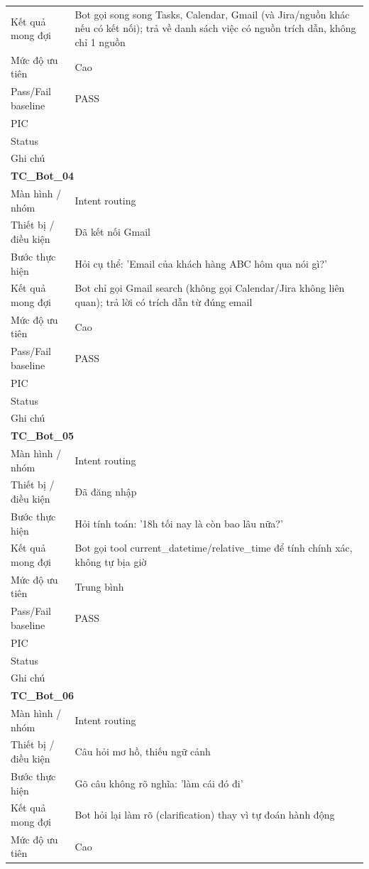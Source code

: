 \documentclass[12pt,a4paper]{article}
\begin{document}
\begin{longtable}{p{3.0cm}p{11.5cm}}
Kết quả mong đợi & Bot gọi song song Tasks, Calendar, Gmail (và Jira/nguồn khác nếu có kết nối); trả về danh sách việc có nguồn trích dẫn, không chỉ 1 nguồn \\
Mức độ ưu tiên & Cao \\
Pass/Fail baseline & PASS \\
PIC &  \\
Status &  \\
Ghi chú &  \\
\midrule
\multicolumn{2}{l}{\textbf{TC\_Bot\_04}} \\
Màn hình / nhóm & Intent routing \\
Thiết bị / điều kiện & Đã kết nối Gmail \\
Bước thực hiện & Hỏi cụ thể: 'Email của khách hàng ABC hôm qua nói gì?' \\
Kết quả mong đợi & Bot chỉ gọi Gmail search (không gọi Calendar/Jira không liên quan); trả lời có trích dẫn từ đúng email \\
Mức độ ưu tiên & Cao \\
Pass/Fail baseline & PASS \\
PIC &  \\
Status &  \\
Ghi chú &  \\
\midrule
\multicolumn{2}{l}{\textbf{TC\_Bot\_05}} \\
Màn hình / nhóm & Intent routing \\
Thiết bị / điều kiện & Đã đăng nhập \\
Bước thực hiện & Hỏi tính toán: '18h tối nay là còn bao lâu nữa?' \\
Kết quả mong đợi & Bot gọi tool current\_datetime/relative\_time để tính chính xác, không tự bịa giờ \\
Mức độ ưu tiên & Trung bình \\
Pass/Fail baseline & PASS \\
PIC &  \\
Status &  \\
Ghi chú &  \\
\midrule
\multicolumn{2}{l}{\textbf{TC\_Bot\_06}} \\
Màn hình / nhóm & Intent routing \\
Thiết bị / điều kiện & Câu hỏi mơ hồ, thiếu ngữ cảnh \\
Bước thực hiện & Gõ câu không rõ nghĩa: 'làm cái đó đi' \\
Kết quả mong đợi & Bot hỏi lại làm rõ (clarification) thay vì tự đoán hành động \\
Mức độ ưu tiên & Cao \\

\end{longtable}
\end{document}
